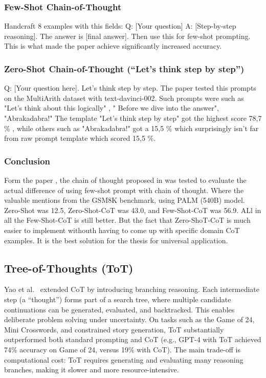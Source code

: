\subsubsection{Few-Shot Chain-of-Thought \cite{chainofthought}}
Handcraft 8 examples with this fields:
Q: [Your question]
A: [Step-by-step reasoning]. The answer is [final answer].
Then use this for few-shot prompting. This is what made the paper achieve significantly increased accuracy.

\subsubsection{Zero-Shot Chain-of-Thought (“Let’s think step by step”) \cite{chainofzero}}
Q: [Your question here].  
Let’s think step by step.
The paper \cite{chainofzero} tested this prompts on the MultiArith dataset with text-davinci-002. Such prompts were such as "Let’s think about this logically" , " Before we dive into the answer", "Abrakadabra!"
The template "Let's think step by step" got the highest score 78,7 \% , while others such as "Abrakadabra!" got a 15,5 \% which surprisingly isn't far from raw prompt template which scored 15,5 \%.

\subsubsection{Conclusion}
Form the paper \cite{chainofzero}, the chain of thought proposed in \cite{chainofthought} was tested to evaluate the actual difference of using few-shot prompt with chain of thought.
Where the valuable mentions from the GSM8K benchmark, using PALM (540B) model.
Zero-Shot was 12.5, Zero-Shot-CoT was 43.0, and Few-Shot-CoT \cite{chainofthought} was 56.9.
ALl in all the Few-Shot-CoT is still better. But the fact that Zero-ShoT-CoT is much easier to implement withouth having to come up with specific domain CoT examples. It is the best solution for the thesis for universal application.





\subsection{Tree-of-Thoughts (ToT)}
Yao et al.~\cite{treeofthought} extended CoT by introducing branching reasoning. Each intermediate step (a ``thought'') forms part of a search tree, where multiple candidate continuations can be generated, evaluated, and backtracked. This enables deliberate problem solving under uncertainty. On tasks such as the Game of 24, Mini Crosswords, and constrained story generation, ToT substantially outperformed both standard prompting and CoT (e.g., GPT-4 with ToT achieved 74\% accuracy on Game of 24, versus 19\% with CoT). The main trade-off is computational cost: ToT requires generating and evaluating many reasoning branches, making it slower and more resource-intensive.

